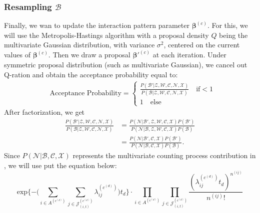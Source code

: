 \documentclass[a4paper]{article}
\begin{document}
\subsubsection{Resampling $\mathcal{B}$}
Finally, we wan to update the interaction pattern parameter $\boldsymbol{\beta}^{(c)}$. For this, we will use the Metropolis-Hastings algorithm with a proposal density $Q$ being the multivariate Gaussian distribution, with variance $\sigma^2$, centered on the current values of $\boldsymbol{\beta}^{(c)}$. Then we draw a proposal $\boldsymbol{\beta}'^{(c)}$ at each iteration. Under symmetric proposal distribution (such as multivariate Gaussian), we cancel out Q-ration and obtain the acceptance probability equal to:
\begin{equation}
\begin{split}
& \mbox{Acceptance Probability}=
\begin{cases}  \frac{P(\mathcal{B'}|\mathcal{Z}, \mathcal{W}, \mathcal{C}, \mathcal{N}, \mathcal{X})}{P(\mathcal{B}|\mathcal{Z}, \mathcal{W}, \mathcal{C}, \mathcal{N}, \mathcal{X})}\quad\text{if}  <1\\
1 \quad \text{else}
\end{cases}
\end{split}
\end{equation}
After factorization, we get
\begin{equation}
\begin{aligned}
\frac{P(\mathcal{B'}|\mathcal{Z}, \mathcal{W}, \mathcal{C}, \mathcal{N}, \mathcal{X})}{P(\mathcal{B}|\mathcal{Z}, \mathcal{W}, \mathcal{C}, \mathcal{N}, \mathcal{X})} &=\frac{P(\mathcal{N}|\mathcal{B'}, \mathcal{Z}, \mathcal{W}, \mathcal{C}, \mathcal{X})P(\mathcal{B'})}{P(\mathcal{N}|\mathcal{B}, \mathcal{Z}, \mathcal{W}, \mathcal{C}, \mathcal{X})P(\mathcal{B})}\\&=\frac{P(\mathcal{N}|\mathcal{B'}, \mathcal{C}, \mathcal{X})P(\mathcal{B'})}{P(\mathcal{N}|\mathcal{B}, \mathcal{C}, \mathcal{X})P(\mathcal{B})}.
\end{aligned}
\end{equation}
Since $P(\mathcal{N}|\mathcal{B}, \mathcal{C}, \mathcal{X})$ represents the multivariate counting process contribution in \cite{zocher2006multivariate}, we will use put the equation below: \begin{equation}
\mbox{exp}\Big\{{-\big(\sum\limits_{i \in A^{(c^{(d)})}}\sum\limits_{j\in \mathcal{J}^{(c^{(d)})}_{(i, t)}}\lambda_{ij}^{(c^{(d)})}\big)t_d}\Big\}\cdot \prod_{i \in A^{(c^{(d)})}}\prod_{j\in \mathcal{J}^{(c^{(d)})}_{(i, t)}}\frac{(\lambda_{ij}^{(c^{(d)})}t_d)^{n^{(ij)}}}{n^{(ij)}!}
\end{equation}
\end{document}
